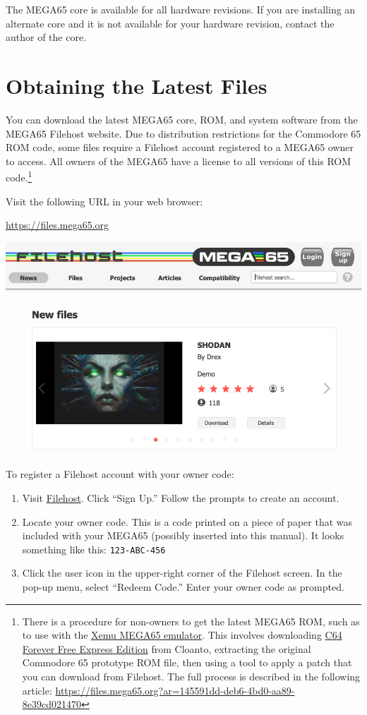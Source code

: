 The MEGA65 core is available for all hardware revisions. If you are installing an alternate core and it is not available for your hardware revision, contact the author of the core.

\section{Obtaining the Latest Files}

You can download the latest MEGA65 core, ROM, and system software from the MEGA65 Filehost website. Due to distribution restrictions for the Commodore 65 ROM code, some files require a Filehost account registered to a MEGA65 owner to access. All owners of the MEGA65 have a license to all versions of this ROM code.\footnote{There is a procedure for non-owners to get the latest MEGA65 ROM, such as to use with the \href{https://github.lgb.hu/xemu/}{Xemu MEGA65 emulator}. This involves downloading \href{https://www.c64forever.com/}{C64 Forever Free Express Edition} from Cloanto, extracting the original Commodore 65 prototype ROM file, then using a tool to apply a patch that you can download from Filehost. The full process is described in the following article: \url{https://files.mega65.org?ar=145591dd-deb6-4bd0-aa89-8e39cd021470}}

Visit the following URL in your web browser:

\url{https://files.mega65.org}

\begin{center}
  \includegraphics[width=0.7\linewidth]{images/filehost_notsignedin.png}
\end{center}

To register a Filehost account with your owner code:

\begin{enumerate}
  \item Visit \href{https://files.mega65.org}{Filehost}. Click ``Sign Up.'' Follow the prompts to create an account.
  \item Locate your owner code. This is a code printed on a piece of paper that was included with your MEGA65 (possibly inserted into this manual). It looks something like this: {\tt 123-ABC-456}
  \item Click the user icon in the upper-right corner of the Filehost screen. In the pop-up menu, select ``Redeem Code.'' Enter your owner code as prompted.
\end{enumerate}

